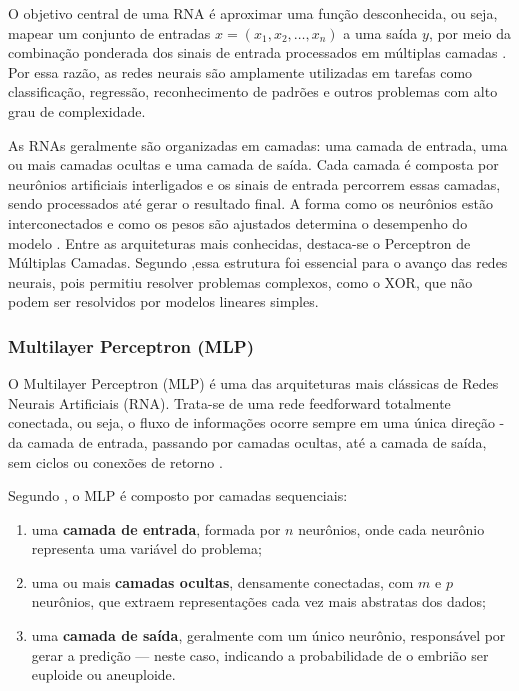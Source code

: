 O objetivo central de uma RNA é aproximar uma função desconhecida, ou seja, mapear um conjunto de entradas $x = (x_1, x_2, \ldots, x_n)$ a uma saída $y$, por meio da combinação ponderada dos sinais de entrada processados em múltiplas camadas \cite{haykin2009}. Por essa razão, as redes neurais são amplamente utilizadas em tarefas como classificação, regressão, reconhecimento de padrões e outros problemas com alto grau de complexidade.

As RNAs geralmente são organizadas em camadas: uma camada de entrada, uma ou mais camadas ocultas e uma camada de saída. Cada camada é composta por neurônios artificiais interligados e os sinais de entrada percorrem essas camadas, sendo processados até gerar o resultado final. A forma como os neurônios estão interconectados e como os pesos são ajustados determina o desempenho do modelo \cite{haykin2009}. Entre as arquiteturas mais conhecidas, destaca-se o Perceptron de Múltiplas Camadas. Segundo ,essa estrutura foi essencial para o avanço das redes neurais, pois permitiu resolver problemas complexos, como o XOR, que não podem ser resolvidos por modelos lineares simples.

\subsubsection{Multilayer Perceptron (MLP)}

O Multilayer Perceptron (MLP) é uma das arquiteturas mais clássicas de Redes Neurais Artificiais (RNA). Trata-se de uma rede feedforward totalmente conectada, ou seja, o fluxo de informações ocorre sempre em uma única direção - da camada de entrada, passando por camadas ocultas, até a camada de saída, sem ciclos ou conexões de retorno \cite{haykin2009}.

Segundo , o MLP é composto por camadas sequenciais:
\begin{enumerate}
    \item uma \textbf{camada de entrada}, formada por $n$ neurônios, onde cada neurônio representa uma variável do problema;
    \item uma ou mais \textbf{camadas ocultas}, densamente conectadas, com $m$ e $p$ neurônios, que extraem representações cada vez mais abstratas dos dados;
    \item uma \textbf{camada de saída}, geralmente com um único neurônio, responsável por gerar a predição — neste caso, indicando a probabilidade de o embrião ser euploide ou aneuploide.
\end{enumerate}

